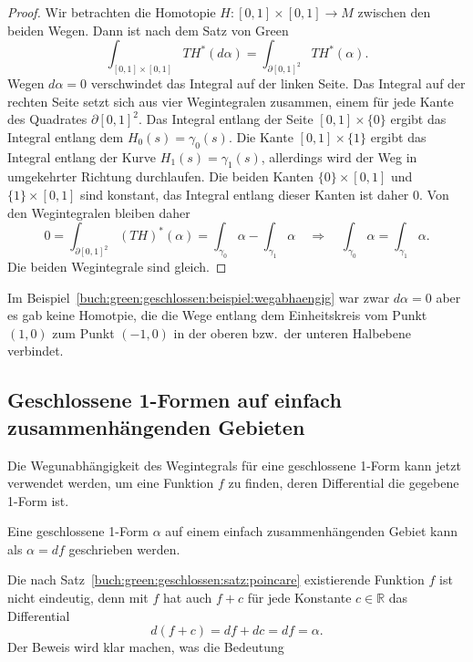 \begin{proof}
Wir betrachten die Homotopie $H:[0,1]\times[0,1]\to M$ zwischen
den beiden Wegen.
Dann ist nach dem Satz von Green
\[
\int_{[0,1]\times[0,1]}
TH^*(d\alpha)
=
\int_{\partial [0,1]^2} TH^*(\alpha).
\]
Wegen $d\alpha=0$ verschwindet das Integral auf der linken Seite.
Das Integral auf der rechten Seite setzt sich aus vier Wegintegralen
zusammen, einem für jede Kante des Quadrates $\partial[0,1]^2$.
Das Integral entlang der Seite $[0,1]\times\{0\}$ ergibt das Integral
entlang dem $H_0(s) = \gamma_0(s)$.
Die Kante $[0,1]\times\{1\}$ ergibt das Integral entlang der
Kurve $H_1(s) = \gamma_1(s)$, allerdings wird der Weg in umgekehrter
Richtung durchlaufen.
Die beiden Kanten $\{0\}\times[0,1]$ und $\{1\}\times[0,1]$ sind
konstant, das Integral entlang dieser Kanten ist daher $0$.
Von den Wegintegralen bleiben daher
\[
0
=
\int_{\partial[0,1]^2} (TH)^*(\alpha)
=
\int_{\gamma_0} \alpha
-
\int_{\gamma_1} \alpha
\quad\Rightarrow\quad
\int_{\gamma_0} \alpha
=
\int_{\gamma_1} \alpha.
\]
Die beiden Wegintegrale sind gleich.
\end{proof}

Im Beispiel~\ref{buch:green:geschlossen:beispiel:wegabhaengig}
war zwar $d\alpha=0$ aber es gab keine Homotpie, die die Wege
entlang dem Einheitskreis vom Punkt $(1,0)$ zum Punkt $(-1,0)$
in der oberen bzw.~der unteren Halbebene verbindet.

%
%
\subsection{Geschlossene 1-Formen auf einfach zusammenhängenden Gebieten}
Die Wegunabhängigkeit des Wegintegrals für eine geschlossene 1-Form
kann jetzt verwendet werden, um eine Funktion $f$ zu finden, deren
Differential die gegebene 1-Form ist.

\begin{satz}
\label{buch:green:geschlossen:satz:poincare}
Eine geschlossene 1-Form $\alpha$ auf einem einfach zusammenhängenden
Gebiet kann als $\alpha=df$ geschrieben werden.
\end{satz}

Die nach Satz~\ref{buch:green:geschlossen:satz:poincare}
existierende Funktion $f$ ist nicht eindeutig, denn mit $f$ hat
auch $f+c$ für jede Konstante $c\in\mathbb{R}$ das Differential
\[
d(f+c) = df + dc = df = \alpha.
\]
Der Beweis wird klar machen, was die Bedeutung

